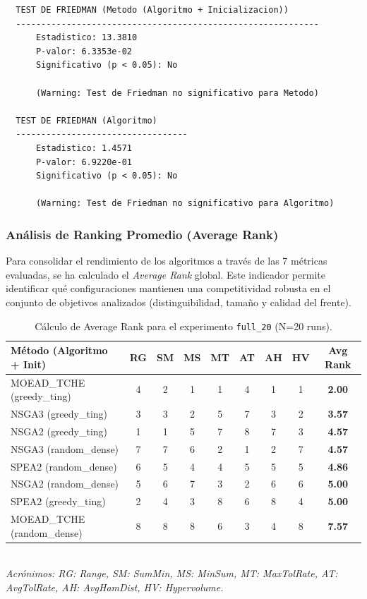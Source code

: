 \documentclass[a4paper,10pt]{article}
\begin{document}
\begin{verbatim}
  TEST DE FRIEDMAN (Metodo (Algoritmo + Inicializacion))
  ------------------------------------------------------------
      Estadistico: 13.3810
      P-valor: 6.3353e-02
      Significativo (p < 0.05): No

      (Warning: Test de Friedman no significativo para Metodo)

  TEST DE FRIEDMAN (Algoritmo)
  ----------------------------------
      Estadistico: 1.4571
      P-valor: 6.9220e-01
      Significativo (p < 0.05): No

      (Warning: Test de Friedman no significativo para Algoritmo)
\end{verbatim}

\subsubsection{Análisis de Ranking Promedio (Average Rank)}

Para consolidar el rendimiento de los algoritmos a través de las 7 métricas evaluadas, se ha calculado el \textit{Average Rank} global. Este indicador permite identificar qué configuraciones mantienen una competitividad robusta en el conjunto de objetivos analizados (distinguibilidad, tamaño y calidad del frente).

\begin{table}[H]
    \centering
    \caption{Cálculo de Average Rank para el experimento \texttt{full\_20} (N=20 runs).}
    \label{tab:avg_rank_full_20}
    \begin{tabular}{lcccccccc}
        \toprule
        \textbf{Método (Algoritmo + Init)} & \textbf{RG} & \textbf{SM} & \textbf{MS} & \textbf{MT} & \textbf{AT} & \textbf{AH} & \textbf{HV} & \textbf{Avg Rank} \\ \midrule
        MOEAD\_TCHE (greedy\_ting) & 4 & 2 & 1 & 1 & 4 & 1 & 1 & \textbf{2.00} \\
        NSGA3 (greedy\_ting)       & 3 & 3 & 2 & 5 & 7 & 3 & 2 & \textbf{3.57} \\
        NSGA2 (greedy\_ting)       & 1 & 1 & 5 & 7 & 8 & 7 & 3 & \textbf{4.57} \\
        NSGA3 (random\_dense)      & 7 & 7 & 6 & 2 & 1 & 2 & 7 & \textbf{4.57} \\
        SPEA2 (random\_dense)      & 6 & 5 & 4 & 4 & 5 & 5 & 5 & \textbf{4.86} \\
        NSGA2 (random\_dense)      & 5 & 6 & 7 & 3 & 2 & 6 & 6 & \textbf{5.00} \\
        SPEA2 (greedy\_ting)       & 2 & 4 & 3 & 8 & 6 & 8 & 4 & \textbf{5.00} \\
        MOEAD\_TCHE (random\_dense) & 8 & 8 & 8 & 6 & 3 & 4 & 8 & \textbf{7.57} \\
        \bottomrule
    \end{tabular}
    \\[1ex]
    \footnotesize \textit{Acrónimos: RG: Range, SM: SumMin, MS: MinSum, MT: MaxTolRate, AT: AvgTolRate, AH: AvgHamDist, HV: Hypervolume.}
\end{table}
\end{document}
